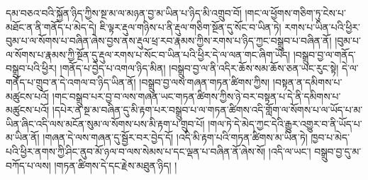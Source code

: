 དམ་བཅའ་བའི་སྐྱོན་ཉིད་ཀྱིས་སྔ་མ་ལ་མཉན་བྱ་མ་ཡིན་པ་ཉིད་མི་འགྲུབ་བོ། །གང་ལ་ཕྱོགས་གཅིག་ཏུ་ངེས་པ་མཐོང་ན་ནི་གནོད་པ་མེད་དེ། ཇི་ལྟར་རྡུལ་གཉིས་པ་ནི་རྡུལ་གཅིག་སྔོན་དུ་སོང་བ་ཡིན་ཏེ། རགས་པ་ཡིན་པའི་ཕྱིར་བུམ་པ་ལ་སོགས་པ་བཞིན་ཞེས་བྱས་ནས་རྡུལ་ཕྲ་རབ་རྣམས་ཀྱིས་རགས་པ་ཉིད་ཀྱང་བསྒྲུབ་པ་བཞིན་ནོ། །བུམ་པ་ལ་སོགས་པ་རྣམས་ཀྱི་སྔོན་དུ་རྡུལ་རགས་པ་སོང་བ་ཡིན་པའི་ཕྱིར་དེ་ལ་ལན་གང་ཞིག་ཡོད། །བསྒྲུབ་བྱ་ལ་གནོད་བསྒྲུབ་པའི་ཕྱིར། །གནོད་པ་བྱེད་པ་འགལ་ཉིད་མིན། །བསྒྲུབ་བྱ་ལ་ནི་འདིར་ཆོས་སམ་ཆོས་ཅན་ཡང་རུང་སྟེ། དེ་ལ་གནོད་པ་གྲུབ་ན་དེ་འགལ་བ་ཉིད་ཡིན་ནོ། །བསྒྲུབ་བྱ་ལས་གཞན་གཏན་ཚིགས་ཀྱིས། །བསྟན་ན་དམིགས་པ་མཚུངས་པའོ། །གང་བསྒྲུབ་པར་བྱ་བ་ལས་གཞན་ཡང་གཏན་ཚིགས་ཀྱིས་ཉེ་བར་བསྟན་པ་དེ་ནི་དམིགས་པ་མཚུངས་པའོ། །དཔེར་ན་སྔ་མ་བཞིན་དུ་མི་རྟག་པར་བསྒྲུབ་པ་ལ་གཏན་ཚིགས་འདི་གློག་ལ་སོགས་པ་ལ་ཡོད་པ་མ་ཡིན་ཞིང་འདི་ལས་མངོན་སུམ་ལ་སོགས་པས་མི་རྟག་པ་གྲུབ་པོ། །གལ་ཏེ་དེ་མེད་ཀྱང་དེའི་རྒྱུར་འགྱུར་བ་ནི་ཡོད་པ་མ་ཡིན་ནོ། །གཞན་དེ་ལས་གཞན་དུ་སྦྱོར་བར་བྱེད་དོ། །འདི་མི་རྟག་པའི་གཏན་ཚིགས་མ་ཡིན་ཏེ། ཁྱབ་པ་མེད་པའི་ཕྱིར་ནགས་ཀྱི་ཤིང་ནུབ་མོ་ཉལ་བ་ལས་སེམས་པ་དང་ལྡན་པ་བཞིན་ནོ་ཞེས་སོ། །འདི་ལ་ཡང་། བསྒྲུབ་བྱ་དུ་མ་བཀོད་པ་ལས། །གཏན་ཚིགས་དེ་དང་རྗེས་མཐུན་ཉིད། །
